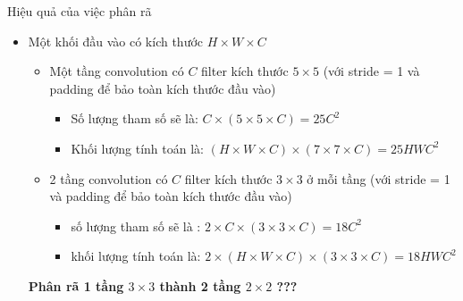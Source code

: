 \documentclass[compress]{beamer}
\begin{document}
\begin{frame}{Hiệu quả của việc phân rã}
\begin{itemize}
\item Một khối đầu vào có kích thước $H \times W \times C$ 
\begin{itemize}
\item Một tầng convolution có $C$ filter kích thước $5 \times 5$ (với stride = 1 và padding để bảo toàn kích thước đầu vào) 
\begin{itemize}
\item Số lượng tham số sẽ là: $C \times (5 \times 5 \times C) = 25C^2$ 
\item Khối lượng tính toán là: $(H \times W \times C) \times (7 \times 7 \times C) = 25HWC^2$ 
\end{itemize}
\item 2 tầng convolution có $C$ filter kích thước $3 \times 3$ ở mỗi tầng (với stride = 1 và padding để bảo toàn kích thước đầu vào) 
\begin{itemize}
\item số lượng tham số sẽ là : $2 \times C \times (3 \times 3 \times C) = 18C^2$
\item khối lượng tính toán là: $2 \times (H \times W \times C) \times (3 \times 3 \times C) = 18HWC^2$
\end{itemize}
\end{itemize}
 \textbf{Phân rã 1 tầng $3\times 3$ thành 2 tầng $2 \times 2$ ???}
\end{itemize}
\end{frame}
\end{document}
